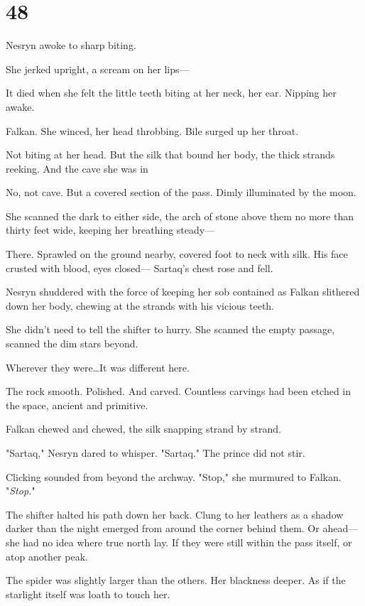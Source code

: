 
\chapter{48}

Nesryn awoke to sharp biting.

She jerked upright, a scream on her lips---

It died when she felt the little teeth biting at her neck, her ear.
Nipping her awake.

Falkan.
She winced, her head throbbing.
Bile surged up her throat.

Not biting at her head.
But the silk that bound her body, the thick strands reeking.
And the cave she was in 

No, not cave.
But a covered section of the pass.
Dimly illuminated by the moon.

She scanned the dark to either side, the arch of stone above them no more than thirty feet wide, keeping her breathing steady---

There.
Sprawled on the ground nearby, covered foot to neck with silk.
His face crusted with blood, eyes closed--- Sartaq's chest rose and fell.

Nesryn shuddered with the force of keeping her sob contained as Falkan slithered down her body, chewing at the strands with his vicious teeth.

She didn't need to tell the shifter to hurry.
She scanned the empty passage, scanned the dim stars beyond.

Wherever they were\ldots It was different here.

The rock smooth.
Polished.
And carved.
Countless carvings had been etched in the space, ancient and primitive.

Falkan chewed and chewed, the silk snapping strand by strand.

"Sartaq," Nesryn dared to whisper.
"Sartaq."
The prince did not stir.

Clicking sounded from beyond the archway.
"Stop," she murmured to Falkan.
"\emph{Stop.}"

The shifter halted his path down her back.
Clung to her leathers as a shadow darker than the night emerged from around the corner behind them.
Or ahead--- she had no idea where true north lay.
If they were still within the pass itself, or atop another peak.

The spider was slightly larger than the others.
Her blackness deeper.
As if the starlight itself was loath to touch her.

